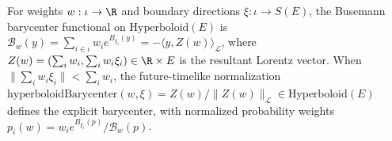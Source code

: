 \begin{definition}
\label{def_hyperboloid_barycenter}
\leanok
{}
For weights $w : \iota \to \R$ and boundary directions $\xi : \iota \to S(E)$, the Busemann barycenter functional on $\mathrm{Hyperboloid}(E)$ is $\mathcal{B}_w(y) = \sum_{i \in \iota} w_i e^{B_{\xi_i}(y)} = -\langle y, Z(w)\rangle_{\mathcal{L}}$, where $Z(w) = (\sum_i w_i, \sum_i w_i \xi_i) \in \R \times E$ is the resultant Lorentz vector. When $\|\sum_i w_i \xi_i\| < \sum_i w_i$, the future-timelike normalization $\mathrm{hyperboloidBarycenter}(w, \xi) = Z(w)/\|Z(w)\|_{\mathcal{L}} \in \mathrm{Hyperboloid}(E)$ defines the explicit barycenter, with normalized probability weights $p_i(w) = w_i e^{B_{\xi_i}(p)} / \mathcal{B}_w(p)$.
\end{definition}

